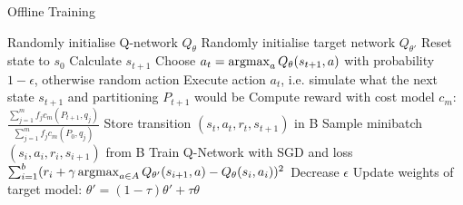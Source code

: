 \begin{algorithm}
    \begin{algorithmic}[1]
        \caption{Offline Training} \label{algorithm:offline-training}
        \State Randomly initialise Q-network $Q_\theta$
        \State Randomly initialise target network $Q_{\theta'}$
         
            \State Reset state to $s_0$
             
                \State Calculate $s_{t+1}$
                \State Choose $a_t = \operatorname*{argmax}_a Q_\theta(s_{t+1},a)$ with probability $1-\epsilon$, otherwise random action
                \State Execute action $a_t$, i.e. simulate what the next state $s_{t+1}$ and partitioning $P_{t+1}$ would be
                \State Compute reward with cost model $c_m$:
                \State $\frac{\sum^m_{j=1} f_jc_m(P_{t+1},q_j)}{\sum^m_{j=1} f_jc_m(P_0,q_j)}$
                \State Store transition $(s_t, a_t, r_t, s_{t+1})$ in B
                \State Sample minibatch $(s_i, a_i, r_i, s_{i+1})$ from B
                \State Train Q-Network with SGD and loss
            \EndFor
            \State $\sum^b_{i=1}(r_i + \gamma \operatorname*{argmax}_{a \in A} Q_{\theta'} (s_{i+1},a) - Q_\theta (s_i, a_i))^2$
            \State Decrease $\epsilon$
            \State Update weights of target model: $\theta' = (1-\tau)\theta' + \tau \theta$
        \EndFor
    \end{algorithmic}
\end{algorithm}

